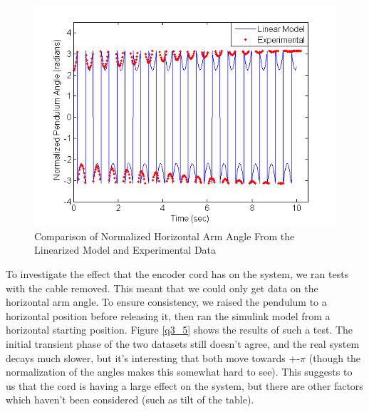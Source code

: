 \documentclass{article}
\theoremstyle{plain}
\theoremstyle{definition}
\theoremstyle{remark}
\begin{document}
\begin{figure}[hbt]
\begin{center}
\includegraphics[width = 13cm]{alphaLinear.png}
\end{center}
\caption{Comparison of Normalized Horizontal Arm Angle From the Linearized Model and Experimental Data}
\label{q3_4}
\end{figure}

To investigate the effect that the encoder cord has on the system, we ran tests with the cable removed. This meant that we could only get data on the horizontal arm angle. To ensure consistency, we raised the pendulum to a horizontal position before releasing it, then ran the simulink model from a horizontal starting position. Figure \ref{q3_5} shows the results of such a test. The initial transient phase of the two datasets still doesn't agree, and the real system decays much slower, but it's interesting that both move towards +-$\pi$ (though the normalization of the angles makes this somewhat hard to see). This suggests to us that the cord is having a large effect on the system, but there are other factors which haven't been considered (such as tilt of the table).\\
\end{document}
